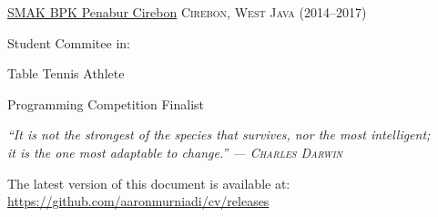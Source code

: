 \documentclass[11pt,a4paper]{article} %
\begin{document}

\headedsection %
{\href{}{SMAK BPK Penabur Cirebon}}
{\dotfill\textsc{Cirebon, West Java (2014--2017)}} {

    \headedsubsection %
    { Student Commitee in: }
    {}
    {}

    \headedsubsection %
    { Table Tennis Athlete}
    {~}
    {}

    \headedsubsection %
    { Programming Competition Finalist}
    {~}
    {}
}

\vfill

\begin{flushright}
    \textit{
        ``It is not the strongest of the species that survives, nor the most intelligent;\\it is the one most adaptable to change.'' — \textsc{Charles Darwin}}
\end{flushright}

\vfill

\vfill

{
\footnotesize\noindent
    The latest version of this document is available at:\\\href{https://github.com/aaronmurniadi/cv/releases}{https://github.com/aaronmurniadi/cv/releases}
}
\end{document}
